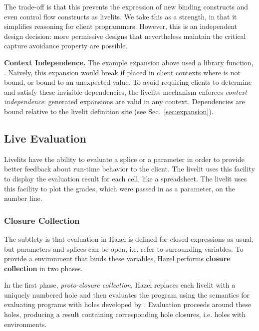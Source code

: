 The trade-off is that this prevents the expression of new 
binding constructs and even control flow constructs as livelits.
We take this as a strength, in that it simplifies 
reasoning for client programmers. However, this is an independent 
design decision: 
more permissive designs that nevertheless 
maintain the critical capture avoidance property are possible.



\textbf{Context Independence.}
The example expansion above used a library function, .
Na\"ively, this expansion would break if placed
in client contexts where  is not bound, or bound to
an unexpected value.
To avoid requiring clients to determine and satisfy these invisible
dependencies, the livelits mechanism enforces \emph{context independence}:
generated expansions are valid in any context. Dependencies are bound
relative to the livelit definition site (see Sec.~\ref{sec:expansion}).

\subsection{Live Evaluation}\label{sec:live-evaluation}
Livelits have the ability to evaluate a splice or a parameter
in order to provide better feedback about run-time behavior to the client.
The  livelit uses this facility to display
the evaluation result for each cell, like a spreadsheet.
The  livelit uses this facility to plot the grades, which were
passed in as a parameter, on the number line.

\subsubsection{Closure Collection}\label{sec:closure-collection-example} The subtlety is that 
evaluation in Hazel is defined for closed expressions as usual,
but parameters and splices can be open, i.e. refer to surrounding variables.
To provide a environment that binds these variables,
Hazel performs \textbf{closure collection} in two phases.

In the first phase, \emph{proto-closure collection},
Hazel replaces each livelit with a uniquely numbered hole and then evaluates the program
using the semantics for evaluating programs with holes developed by \citet{HazelnutLive}.
Evaluation proceeds around these holes, producing a result containing
corresponding hole closures, i.e. holes with environments.

